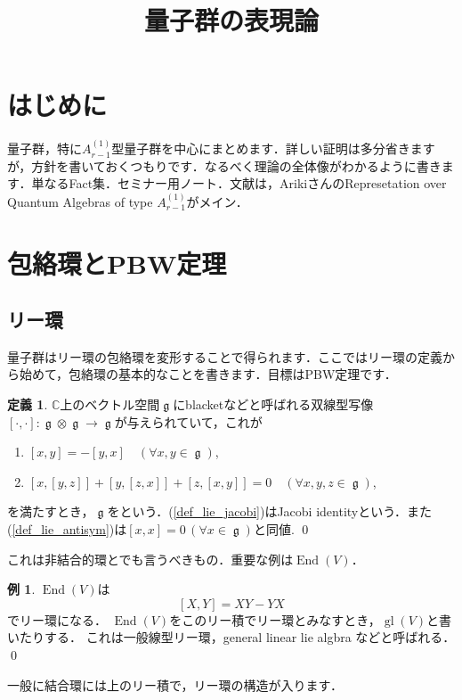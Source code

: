 \documentclass[dvipdfmx,autodetect-engine]{article}
\title{量子群の表現論}
\author{}
\date{}
\theoremstyle{definition}
\newtheorem{Def}{定義}
\newtheorem{Ex}{例}
\DeclareMathOperator{\End}{End}
\DeclareMathOperator{\gl}{gl}
\DeclareMathOperator{\lie}{\mathfrak{g}}
\begin{document}
\maketitle
\section{はじめに}
\label{sec_intro}
      量子群，特に$A_{r-1}^{(1)}$型量子群を中心にまとめます．詳しい証明は多分省きますが，方針を書いておくつもりです．なるべく理論の全体像がわかるように書きます．単なるFact集．セミナー用ノート．文献は，ArikiさんのRepresetation over Quantum Algebras of type $A_{r-1}^{(1)}$がメイン．
\section{包絡環とPBW定理}
\label{sec_enveloping_algebras}
\subsection{リー環}
    量子群はリー環の包絡環を変形することで得られます．ここではリー環の定義から始めて，包絡環の基本的なことを書きます．目標はPBW定理です．
    \begin{Def}
      \label{def_lie}
      $\mathbb{C}$上のベクトル空間$\lie$にblacketなどと呼ばれる双線型写像$[\cdot, \cdot]:\lie \otimes \lie \to \lie$が与えられていて，これが
      \begin{enumerate}
          \item \label{def_lie_antisym} $[x, y] = - [y, x] \quad (\forall x, y \in \lie)$,
          \item \label{def_lie_jacobi} $[x, [y, z]] + [y, [z, x]] + [z, [x, y]] = 0 \quad (\forall x,y,z \in \lie)$,
      \end{enumerate}
      を満たすとき，$\lie$をという．(\ref{def_lie_jacobi})はJacobi identityという．また(\ref{def_lie_antisym})は$[x,x] = 0\,(\forall x \in \lie)$と同値.
      \qed
    \end{Def}

    これは非結合的環とでも言うべきもの．重要な例は$\End(V)$．
    \begin{Ex}
    \label{Ex_gl}
        $\End(V)$は
        \[
          [X, Y] = XY - YX
        \]
        でリー環になる．
        $\End(V)$をこのリー積でリー環とみなすとき，$\gl(V)$と書いたりする．
        これは一般線型リー環，general linear lie algbra などと呼ばれる．
        \qed
    \end{Ex}

    一般に結合環には上のリー積で，リー環の構造が入ります．
\end{document}
